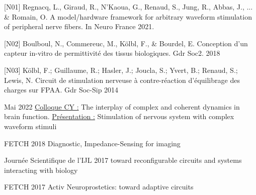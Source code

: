 \begin{cvskills}   
  \cvskill
    {[N01]} %
    {Regnacq, L., Giraud, R., N'Kaoua, G., Renaud, S., Jung, R., Abbas, J., ... \& Romain, O. A model/hardware framework for arbitrary waveform stimulation of peripheral nerve fibers. In Neuro France 2021. } %
\end{cvskills}
\begin{cvskills}   
  \cvskill
    {[N02]} %
    {Boulboul, N., Commereuc, M., Kölbl, F., \& Bourdel, E. Conception d’un capteur in-vitro de permittivité des tissus biologiques. Gdr Soc2. 2018} %
\end{cvskills}
\begin{cvskills}   
  \cvskill
    {[N03]} %
    {Kölbl, F.; Guillaume, R.; Hasler, J.; Joucla, S.; Yvert, B.; Renaud, S.; Lewis, N. Circuit de stimulation nerveuse à contre-réaction d’équilibrage des charges sur FPAA. Gdr Soc-Sip 2014} %
\end{cvskills}

\begin{cvskills}   
  \cvskill
     {Mai 2022} %
    {\underline{Colloque CY :} The interplay of complex and coherent dynamics in brain function. \underline{Présentation :} Stimulation of nervous system with complex waveform stimuli} %
\end{cvskills}
\begin{cvskills}   
  \cvskill
    {FETCH 2018} %
    {Diagnostic, Impedance-Sensing for imaging} %
\end{cvskills}
\begin{cvskills}   
  \cvskill
    {Journée Scientifique de l’IJL 2017} %
    { toward reconfigurable circuits and systems interacting with biology} %
\end{cvskills}
\begin{cvskills}   
  \cvskill
    {FETCH 2017} %
    { Activ Neuroprostetics: toward adaptive circuits} %
\end{cvskills}